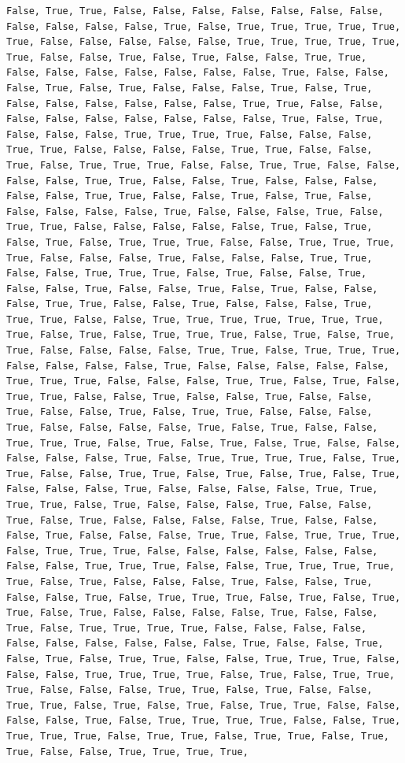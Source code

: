 \documentclass[
  letterpaper,
  DIV=11,
  numbers=noendperiod]{scrartcl}
\begin{document}
\begin{verbatim}
False, True, True, False, False, False, False, False, False, False, False, False, False, False, True, False, True, True, True, True, True, True, False, False, False, False, False, True, True, True, True, True, True, False, False, True, False, True, False, False, True, True, False, False, False, False, False, False, False, True, False, False, False, True, False, True, False, False, False, True, False, True, False, False, False, False, False, False, True, True, False, False, False, False, False, False, False, False, False, True, False, True, False, False, False, True, True, True, True, False, False, False, True, True, False, False, False, False, True, True, False, False, True, False, True, True, True, False, False, True, True, False, False, False, False, True, True, False, False, True, False, False, False, False, False, True, True, False, False, True, False, True, False, False, False, False, False, True, False, False, False, True, False, True, True, False, False, False, False, False, True, False, True, False, True, False, True, True, True, False, False, True, True, True, True, False, False, False, True, False, False, False, True, True, False, False, True, True, True, False, True, False, False, True, False, False, True, False, False, True, False, True, False, False, False, True, True, False, False, True, False, False, False, True, True, True, False, False, True, True, True, True, True, True, True, True, False, True, False, True, True, True, False, True, False, True, True, False, False, False, False, True, True, False, True, True, True, False, False, False, False, True, False, False, False, False, False, True, True, True, False, False, False, True, True, False, True, False, True, True, False, False, True, False, False, True, False, False, True, False, False, True, False, True, True, False, False, False, True, False, False, False, False, True, False, True, False, False, True, True, True, False, True, False, True, False, True, False, False, False, False, False, True, False, True, True, True, True, False, True, True, False, False, True, True, False, True, False, True, False, True, False, False, False, True, False, False, False, False, True, True, True, True, False, True, False, False, False, True, False, False, True, False, True, False, False, False, False, True, False, False, False, True, False, False, False, True, True, False, True, True, True, False, True, True, True, False, False, False, False, False, False, False, False, True, True, True, False, False, True, True, True, True, True, False, True, False, False, False, True, False, False, True, False, False, True, False, True, True, True, False, True, False, True, True, False, True, False, False, False, False, True, False, False, True, False, True, True, True, True, False, False, False, False, False, False, False, False, False, False, True, False, False, True, False, True, False, True, True, False, False, True, True, True, False, False, False, True, True, True, True, False, True, False, True, True, True, False, False, False, True, True, False, True, False, False, True, True, False, True, False, True, False, True, True, False, False, False, False, True, False, True, True, True, True, False, False, True, True, True, True, False, True, True, False, True, True, False, True, True, False, False, True, True, True, True, 
\end{verbatim}
\end{document}
